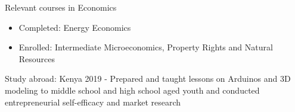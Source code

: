 \begin{cventries}
{\begin{cvitems}
\begin {itemize}
        \end {itemize}
        \ifcv
        \item {Relevant courses in Economics}
        \begin{itemize}
          \item Completed: Energy Economics
          \item Enrolled: Intermediate Microeconomics, Property Rights and Natural Resources
        \end{itemize}
        \fi
    \ifcv
\item {Study abroad: Kenya 2019 - Prepared and taught lessons on Arduinos and 3D modeling to
middle school and high school aged youth and conducted entrepreneurial self-efficacy and market research }
\fi
      \end{cvitems}
    }
    {}
\end{cventries}